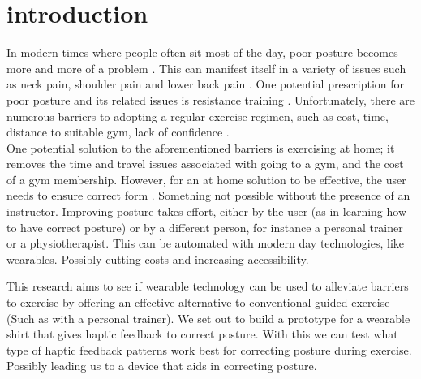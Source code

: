 \documentclass[sigconf]{acmart}
\begin{document}
\maketitle
\section{introduction}
 In modern times where people often sit most of the day, poor posture becomes more and more of a problem \cite{subasi2015evaluation}. This can manifest itself in a variety of issues such as neck pain, shoulder pain and lower back pain \cite{hush2006risk, sadeghian2012persistent, o2011association}. One potential prescription for poor posture and its related issues is resistance training \cite{falla2007effect, steffens2016prevention, ruivo2017effects}. Unfortunately, there are numerous barriers to adopting a regular exercise regimen, such as cost, time, distance to suitable gym, lack of confidence \cite{greenwood2015motivators, mailey2016overcoming, sechrist1987development}.  \\


One potential solution to the aforementioned barriers is exercising at home; it removes the time and travel issues associated with going to a gym, and the cost of a gym membership. However, for an at home solution to be effective, the user needs to ensure correct form \cite{winett2001potential}. Something not possible without the presence of an instructor. Improving posture takes effort, either by the user (as in learning how to have correct posture) or by a different person, for instance a personal trainer or a physiotherapist. This can be automated with modern day technologies, like wearables. Possibly cutting costs and increasing accessibility. 

This research aims to see if wearable technology can be used to alleviate barriers to exercise by offering an effective alternative to conventional guided exercise (Such as with a personal trainer). We set out to build a prototype for a wearable shirt that gives haptic feedback to correct posture. With this we can test what type of haptic feedback patterns work best for correcting posture during exercise. Possibly leading us to a device that aids in correcting posture.
\end{document}
